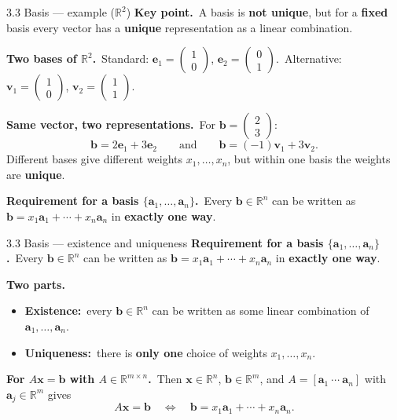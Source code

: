 \documentclass[11pt,aspectratio=169]{beamer}
\begin{document}
\begin{frame}{3.3 Basis --- example ($\mathbb{R}^2$)}
  \footnotesize
  \textbf{Key point.}\
  A basis is \textbf{not unique}, but for a \textbf{fixed} basis every vector has a
  \textbf{unique} representation as a linear combination.

  \medskip
  \textbf{Two bases of $\mathbb{R}^2$.}\
  Standard: $\mathbf{e}_1=\begin{pmatrix}1\\ 0\end{pmatrix}$,
  $\mathbf{e}_2=\begin{pmatrix}0\\ 1\end{pmatrix}$.\
  Alternative: $\mathbf{v}_1=\begin{pmatrix}1\\ 0\end{pmatrix}$,
  $\mathbf{v}_2=\begin{pmatrix}1\\ 1\end{pmatrix}$.

  \medskip
  \textbf{Same vector, two representations.}\
  For $\mathbf{b}=\begin{pmatrix}2\\ 3\end{pmatrix}$:
  \[
    \mathbf{b}=2\mathbf{e}_1+3\mathbf{e}_2
    \qquad\text{and}\qquad
    \mathbf{b}=(-1)\mathbf{v}_1+3\mathbf{v}_2.
  \]
  Different bases give different weights $x_1,\ldots,x_n$, but within one basis the weights are
  \textbf{unique}.

  \medskip
  \textbf{Requirement for a basis $\{\mathbf{a}_1,\ldots,\mathbf{a}_n\}$.}\
  Every $\mathbf{b}\in\mathbb{R}^n$ can be written as
  $\mathbf{b}=x_1\mathbf{a}_1+\cdots+x_n\mathbf{a}_n$ in \textbf{exactly one way}.
\end{frame}

\begin{frame}{3.3 Basis --- existence and uniqueness}
  \footnotesize
  \textbf{Requirement for a basis $\{\mathbf{a}_1,\ldots,\mathbf{a}_n\}$.}\
  Every $\mathbf{b}\in\mathbb{R}^n$ can be written as
  $\mathbf{b}=x_1\mathbf{a}_1+\cdots+x_n\mathbf{a}_n$ in \textbf{exactly one way}.

  \medskip
  \textbf{Two parts.}\
  \begin{itemize}
    \item \textbf{Existence:}\ every $\mathbf{b}\in\mathbb{R}^n$ can be written as some linear
      combination of $\mathbf{a}_1,\ldots,\mathbf{a}_n$.
    \item \textbf{Uniqueness:}\ there is \textbf{only one} choice of weights
      $x_1,\ldots,x_n$.
  \end{itemize}

  \medskip
  \textbf{For $A\mathbf{x}=\mathbf{b}$ with $A\in\mathbb{R}^{m\times n}$.}\
  Then $\mathbf{x}\in\mathbb{R}^n$, $\mathbf{b}\in\mathbb{R}^m$, and
  $A=[\mathbf{a}_1\ \cdots\ \mathbf{a}_n]$ with $\mathbf{a}_j\in\mathbb{R}^m$ gives
  \[
    A\mathbf{x}=\mathbf{b}
    \quad\Longleftrightarrow\quad
    \mathbf{b}=x_1\mathbf{a}_1+\cdots+x_n\mathbf{a}_n.
  \]
\end{frame}
\end{document}
